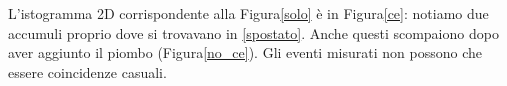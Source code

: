 L'istogramma 2D corrispondente alla Figura\autoref{solo} è in Figura\autoref{ce}: notiamo due accumuli proprio dove si trovavano in \autoref{spostato}. Anche questi scompaiono dopo aver aggiunto il piombo (Figura\autoref{no_ce}). Gli eventi misurati non possono che essere coincidenze casuali.

